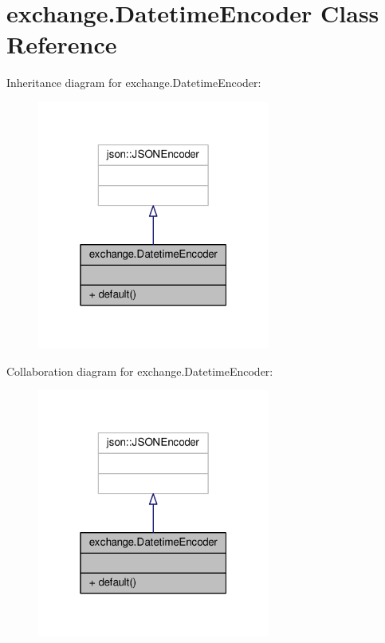 \hypertarget{classexchange_1_1_datetime_encoder}{}\section{exchange.\+Datetime\+Encoder Class Reference}
\label{classexchange_1_1_datetime_encoder}


Inheritance diagram for exchange.\+Datetime\+Encoder\+:\nopagebreak
\begin{figure}[H]
\begin{center}
\leavevmode
\includegraphics[width=217pt]{classexchange_1_1_datetime_encoder__inherit__graph}
\end{center}
\end{figure}


Collaboration diagram for exchange.\+Datetime\+Encoder\+:\nopagebreak
\begin{figure}[H]
\begin{center}
\leavevmode
\includegraphics[width=217pt]{classexchange_1_1_datetime_encoder__coll__graph}
\end{center}
\end{figure}
